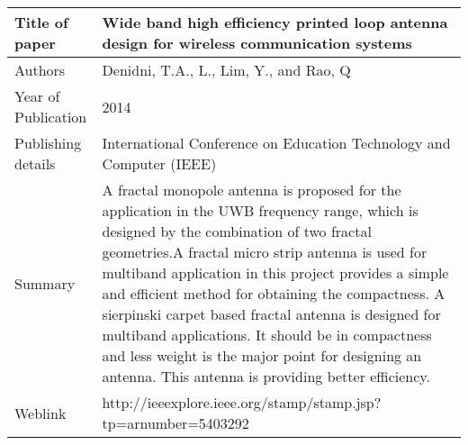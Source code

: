 \documentclass{article}
\begin{document}
\begin{table}
  \centering
	\begin{tabular}{ |l|p{11cm}| }
			\hline
		     Title of paper &  Wide band high efficiency printed loop antenna design for wireless communication systems  \\
		     \hline
			 Authors & Denidni, T.A., L., Lim, Y., and Rao, Q \\
			\hline
			 Year of Publication & 2014 \\
			\hline
			 Publishing details & International Conference on Education Technology and Computer (IEEE) \\ \hline
			 Summary & A fractal monopole antenna is proposed for the application in the UWB frequency range, which is designed by the combination of two fractal geometries.A fractal micro strip antenna is used for multiband application in this project provides a simple and efficient method for obtaining the compactness. A sierpinski carpet based fractal antenna is designed for multiband applications. It should be in compactness and less weight is the major point for designing an antenna. This antenna is providing better efficiency.\\
			\hline
			 Weblink & http://ieeexplore.ieee.org/stamp/stamp.jsp?tp=arnumber=5403292 \\
			 \hline			 
	\end{tabular}		

\end{table}
\end{document}
